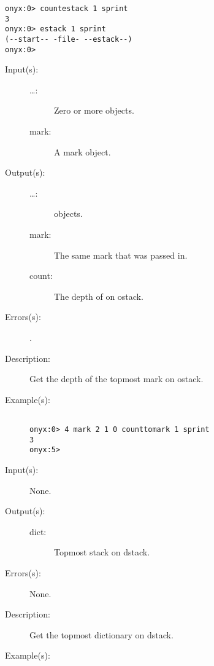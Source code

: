 \begin{description}
\begin{description}
\begin{verbatim}
onyx:0> countestack 1 sprint
3
onyx:0> estack 1 sprint
(--start-- -file- --estack--)
onyx:0>
		\end{verbatim}
	\end{description}
\label{systemdict:counttomark}
\item[{\onyxop{mark \dots}{counttomark}{mark \dots count}}: ]
	\begin{description}\item[]
	\item[Input(s): ]
		\begin{description}\item[]
		\item[\dots: ]
			Zero or more objects.
		\item[mark: ]
			A mark object.
		\end{description}
	\item[Output(s): ]
		\begin{description}\item[]
		\item[\dots: ]
			 objects.
		\item[mark: ]
			The same mark that was passed in.
		\item[count: ]
			The depth of  on ostack.
		\end{description}
	\item[Errors(s): ]
		\begin{description}\item[]
		\item[.]
		\end{description}
	\item[Description: ]
		Get the depth of the topmost mark on ostack.
	\item[Example(s): ]\begin{verbatim}

onyx:0> 4 mark 2 1 0 counttomark 1 sprint
3
onyx:5>
		\end{verbatim}
	\end{description}
\label{systemdict:currentdict}
\item[{\onyxop{--}{currentdict}{dict}}: ]
	\begin{description}\item[]
	\item[Input(s): ] None.
	\item[Output(s): ]
		\begin{description}\item[]
		\item[dict: ]
			Topmost stack on dstack.
		\end{description}
	\item[Errors(s): ] None.
	\item[Description: ]
		Get the topmost dictionary on dstack.
	\item[Example(s): ]\begin{verbatim}


\end{verbatim}
\end{description}
\end{description}
